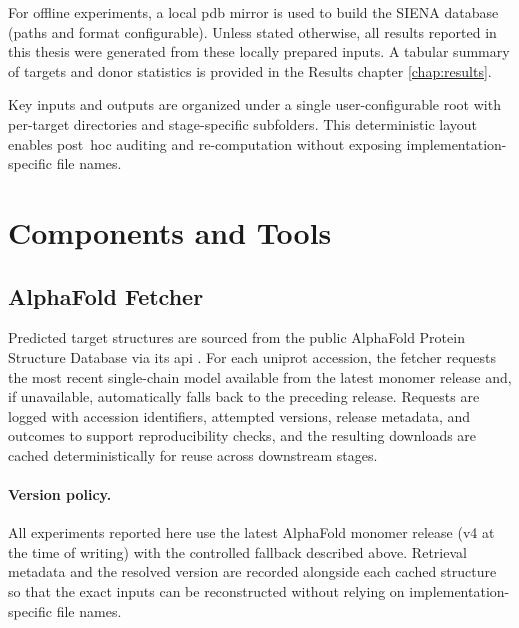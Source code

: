 For offline experiments, a local \gls{pdb} mirror is used to build the SIENA database (paths and format configurable). Unless stated otherwise, all results reported in this thesis were generated from these locally prepared inputs. A tabular summary of targets and donor statistics is provided in the Results chapter \ref{chap:results}.

Key inputs and outputs are organized under a single user-configurable root with per-target directories and stage-specific subfolders. This deterministic layout enables post~hoc auditing and re-computation without exposing implementation-specific file names.

\section{Components and Tools}
\subsection{AlphaFold Fetcher}\label{subsec:alphafold_fetcher}

Predicted target structures are sourced from the public AlphaFold Protein Structure Database \cite{varadiAlphaFoldProteinStructure2022} via its \gls{api} \cite{AlphaFoldProteinStructurea}. For each \gls{uniprot} accession, the fetcher requests the most recent single-chain model available from the latest monomer release and, if unavailable, automatically falls back to the preceding release. Requests are logged with accession identifiers, attempted versions, release metadata, and outcomes to support reproducibility checks, and the resulting downloads are cached deterministically for reuse across downstream stages.

\paragraph{Version policy.} All experiments reported here use the latest AlphaFold monomer release (v4 at the time of writing) with the controlled fallback described above. Retrieval metadata and the resolved version are recorded alongside each cached structure so that the exact inputs can be reconstructed without relying on implementation-specific file names.

